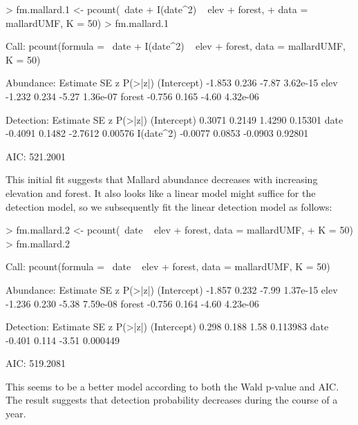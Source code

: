 \documentclass[article,shortnames]{jss}
\begin{document}
\begin{Schunk}
\begin{Sinput}
> fm.mallard.1 <- pcount(~date + I(date^2) ~ elev + forest, 
+     data = mallardUMF, K = 50)
> fm.mallard.1
\end{Sinput}
\begin{Soutput}
Call:
pcount(formula = ~date + I(date^2) ~ elev + forest, data = mallardUMF, 
    K = 50)

Abundance:
            Estimate    SE     z  P(>|z|)
(Intercept)   -1.853 0.236 -7.87 3.62e-15
elev          -1.232 0.234 -5.27 1.36e-07
forest        -0.756 0.165 -4.60 4.32e-06

Detection:
            Estimate     SE       z P(>|z|)
(Intercept)   0.3071 0.2149  1.4290 0.15301
date         -0.4091 0.1482 -2.7612 0.00576
I(date^2)    -0.0077 0.0853 -0.0903 0.92801

AIC: 521.2001 
\end{Soutput}
\end{Schunk}

This initial fit suggests that Mallard abundance decreases with
increasing elevation and forest.  It also looks like a linear model
might suffice for the detection model, so we subsequently fit the
linear detection model as follows:


\begin{Schunk}
\begin{Sinput}
> fm.mallard.2 <- pcount(~date ~ elev + forest, data = mallardUMF, 
+     K = 50)
> fm.mallard.2
\end{Sinput}
\begin{Soutput}
Call:
pcount(formula = ~date ~ elev + forest, data = mallardUMF, K = 50)

Abundance:
            Estimate    SE     z  P(>|z|)
(Intercept)   -1.857 0.232 -7.99 1.37e-15
elev          -1.236 0.230 -5.38 7.59e-08
forest        -0.756 0.164 -4.60 4.23e-06

Detection:
            Estimate    SE     z  P(>|z|)
(Intercept)    0.298 0.188  1.58 0.113983
date          -0.401 0.114 -3.51 0.000449

AIC: 519.2081 
\end{Soutput}
\end{Schunk}

This seems to be a better model according to both the Wald p-value and
AIC.  The result suggests that detection probability decreases during the 
course of a year.
\end{document}
